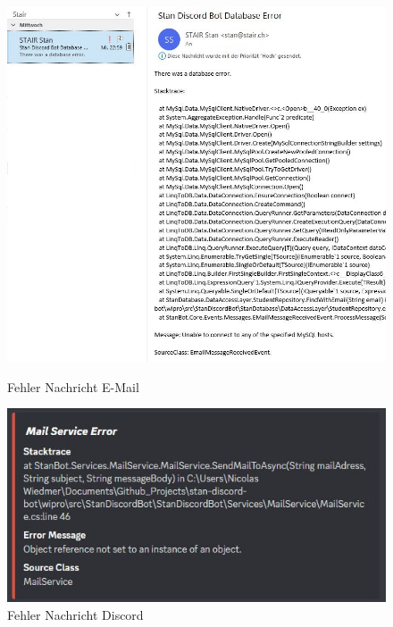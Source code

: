 \documentclass[a4paper, table]{article}
\begin{document}
\begin{figure}[h]
    \begin{minipage}[t]{0.5\textwidth}
        \includegraphics[width=1\textwidth]{img/DatabaseErrorNotificationEmail.png}
        \caption{Fehler Nachricht E-Mail}
    \end{minipage}
    \begin{minipage}[t]{0.5\textwidth}
        \includegraphics[width=1\textwidth]{img/MailErrorNotificationEmbed.png}
        \caption{Fehler Nachricht Discord}
    \end{minipage}
    \label{fig:error-notifications}
\end{figure}
\end{document}
